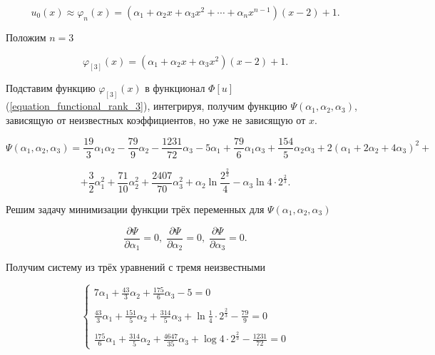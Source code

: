 \documentclass{article}
\begin{document}
\begin{displaymath}
	u_{0}(x) \approx \varphi_{n}(x) = (\alpha_{1} + \alpha_{2}x + \alpha_{3}x^2 + \cdots + \alpha_{n}x^{n-1})(x-2)+1.
\end{displaymath}

\noindent Положим $n = 3$

\begin{displaymath}
	\varphi_{[3]}(x) = (\alpha_{1} + \alpha_{2}x + \alpha_{3}x^2)(x-2)+1.
\end{displaymath}

\noindent Подставим функцию $\varphi_{[3]}(x)$ в функционал $\Phi[u]$ (\ref{equation_functional_rank_3}), интегрируя, получим функцию $\Psi(\alpha_{1}, \alpha_{2}, \alpha_{3})$, зависящую от неизвестных коэффициентов, но уже не зависящую от $x$.

\begin{displaymath}
	\Psi(\alpha_{1}, \alpha_{2}, \alpha_{3}) = \frac{19}{3}\alpha_{1}\alpha_{2} - \frac{79}{9}\alpha_{2} - \frac{1231}{72}\alpha_{3} - 5\alpha_{1} + \frac{79}{6}\alpha_{1}\alpha_{3} + \frac{154}{5}\alpha_{2}\alpha_{3} + 2(\alpha_{1} + 2 \alpha_{2} + 4\alpha_{3})^2 +
\end{displaymath}
	
\begin{displaymath}	
	 + \frac{3}{2}\alpha_{1}^{2} +  \frac{71}{10}\alpha_{2}^{2} + \frac{2407}{70}\alpha_{3}^{2} + \alpha_{2} \ln{\frac{2^{\frac{2}{3}}}{4}} - \alpha_{3} \ln{4 \cdot 2^{\frac{2}{3}}}.
\end{displaymath}

\noindent Решим задачу минимизации функции трёх переменных для $\Psi(\alpha_{1}, \alpha_{2}, \alpha_{3})$

\begin{displaymath}
	\frac{\partial \Psi}{\partial \alpha_{1}} = 0, \;
	\frac{\partial \Psi}{\partial \alpha_{2}} = 0, \;
	\frac{\partial \Psi}{\partial \alpha_{3}} = 0.
\end{displaymath}

\noindent Получим систему из трёх уравнений с тремя неизвестными

\begin{displaymath}
	\begin{cases}
		7\alpha_{1} + \frac{43}{3}\alpha_{2} + \frac{175}{6}\alpha_{3} - 5 = 0 \\
		\\
		\frac{43}{3}\alpha_{1} + \frac{151}{5}\alpha_{2} + \frac{314}{5}\alpha_{3} + \ln{\frac{1}{4} \cdot 2^{\frac{2}{3}}} - \frac{79}{9} = 0 \\
		\\
		\frac{175}{6}\alpha_{1} + \frac{314}{5}\alpha_{2} + \frac{4647}{35}\alpha_{3} + \log{4 \cdot 2^{\frac{2}{3}}} - \frac{1231}{72} = 0
	\end{cases}
\end{displaymath}
\end{document}
